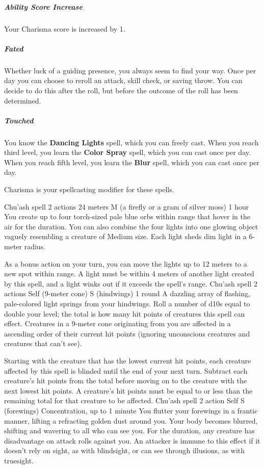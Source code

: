     \subparagraph{Ability Score Increase} Your Charisma score is increased by 1.

    \subparagraph{Fated} Whether luck of a guiding presence, you always seem to find your way.
    Once per day you can choose to reroll an attack, skill check, or saving throw.
    You can decide to do this after the roll, but before the outcome of the roll has been determined.

    \subparagraph{Touched} You know the \textbf{Dancing Lights} spell, which you can freely cast.
    When you reach third level, you learn the \textbf{Color Spray} spell, which you can cast once per day.
    When you reach fifth level, you learn the \textbf{Blur} spell, which you can cast once per day.

    Charisma is your spellcasting modifier for these spells.

        {Chu'ash spell}
        {2 actions}
        {24 meters}
        {M (a firefly or a gram of silver moss)}
        {1 hour}
        You create up to four torch-sized pale blue orbs within range that hover in the air for the duration.
        You can also combine the four lights into one glowing object vaguely resembling a creature of Medium size.
        Each light sheds dim light in a 6-meter radius.

        As a bonus action on your turn, you can move the lights up to 12 meters to a new spot within range.
        A light must be within 4 meters of another light created by this spell, and a light winks out if it exceeds the spell's range.
        {Chu'ash spell}
        {2 actions}
        {Self (9-meter cone)}
        {S (hindwings)}
        {1 round}
        A dazzling array of flashing, pale-colored light springs from your hindwings.
        Roll a number of d10s equal to double your level; the total is how many hit points of creatures this spell can effect.
        Creatures in a 9-meter cone originating from you are affected in a ascending order of their current hit points (ignoring unconscious creatures and creatures that can't see).

        Starting with the creature that has the lowest current hit points, each creature affected by this spell is blinded until the end of your next turn.
        Subtract each creature's hit points from the total before moving on to the creature with the next lowest hit points.
        A creature's hit points must be equal to or less than the remaining total for that creature to be affected.
        {Chu'ash spell}
        {2 action}
        {Self}
        {S (forewings)}
        {Concentration, up to 1 minute}
        You flutter your forewings in a frantic manner, lifting a refracting golden dust around you.
        Your body becomes blurred, shifting and wavering to all who can see you.
        For the duration, any creature has disadvantage on attack rolls against you.
        An attacker is immune to this effect if it doesn't rely on sight, as with blindsight, or can see through illusions, as with truesight.

